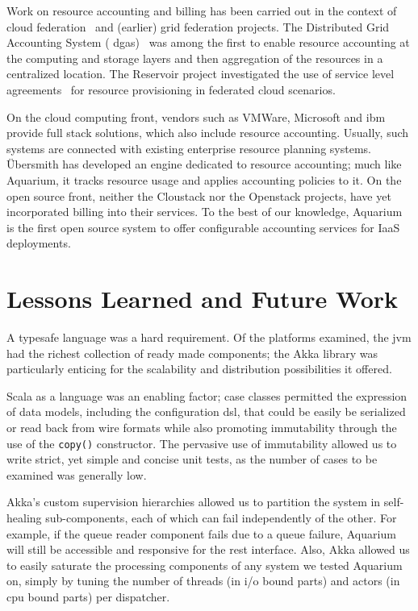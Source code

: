 \documentclass[letterpaper,twocolumn,10pt]{article}
\begin{document}
Work on resource accounting and billing has been carried out in the
context of cloud federation~\cite{Rochw09, Elmro09} and (earlier) grid
federation projects. The Distributed Grid Accounting System ({\sc
  dgas})~\cite{Piro06} was among the first to enable resource
accounting at the computing and storage layers and then aggregation of
the resources in a centralized location. The Reservoir project
investigated the use of service level agreements~\cite{Elmro09} for
resource provisioning in federated cloud scenarios.

On the cloud computing front, vendors such as VMWare, Microsoft and
{\sc ibm} provide full stack solutions, which also include resource
accounting. Usually, such systems are connected with existing
enterprise resource planning systems. \"Ubersmith has developed an
engine dedicated to resource accounting; much like Aquarium, it tracks
resource usage and applies accounting policies to it. On the open
source front, neither the Cloustack nor the Openstack projects, have
yet incorporated billing into their services. To the best of our
knowledge, Aquarium is the first open source system to offer
configurable accounting services for IaaS deployments.


\section{Lessons Learned and Future Work}

A typesafe language was a hard requirement. Of the platforms examined,
the {\sc jvm} had the richest collection of ready made components; the
Akka library was particularly enticing for the scalability and
distribution possibilities it offered.

Scala as a language was an enabling factor; case classes permitted the
expression of data models, including the configuration {\sc dsl}, that
could be easily be serialized or read back from wire formats while
also promoting immutability through the use of the \texttt{copy()}
constructor. The pervasive use of immutability allowed us to write
strict, yet simple and concise unit tests, as the number of cases to
be examined was generally low. 

Akka's custom supervision hierarchies allowed us to partition the
system in self-healing sub-components, each of which can fail
independently of the other. For example, if the queue reader component
fails due to a queue failure, Aquarium will still be accessible and
responsive for the {\sc rest} interface. Also, Akka allowed us to
easily saturate the processing components of any system we tested
Aquarium on, simply by tuning the number of threads (in {\sc i/o}
bound parts) and actors (in {\sc cpu} bound parts) per dispatcher.
\end{document}
